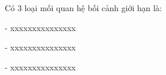 Có 3 loại mối quan hệ bối cảnh giới hạn là:

- xxxxxxxxxxxxxxx

- xxxxxxxxxxxxxxx

- xxxxxxxxxxxxxxx
